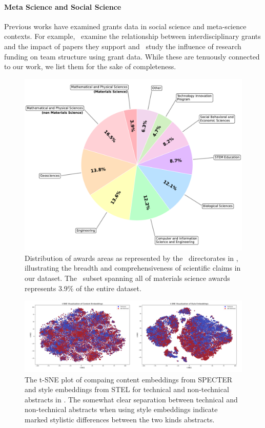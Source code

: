 \documentclass[11pt]{article}
\begin{document}
\paragraph{Meta Science and Social Science} Previous works have examined grants data in social science and meta-science contexts. For example,~\citet{park2024} examine the relationship between interdisciplinary grants and the impact of papers they support and~\citet{xu2022} study the influence of research funding on team structure using grant data. While these are tenuously connected to our work, we list them for the sake of completeness.
\begin{figure}[t]
    \centering
    \includegraphics[width=1\linewidth]{images/directorate_distribution_with_materials.pdf}
    \caption{Distribution of awards areas as represented by the \NSF~directorates in \DatasetName, illustrating the breadth and comprehensiveness of scientific claims in our dataset. The \DatasetNameMatSci~subset spanning all of materials science awards represents 3.9\% of the entire dataset.}
    \label{fig:award-distribution}
\end{figure}
\begin{figure}[h!]
    \centering
    \includegraphics[width=1\linewidth]{images/tsne-specter-stel.png}
    \caption{The t-SNE plot of compaing content embeddings from SPECTER \cite{cohan-etal-2020-specter} and style embeddings from STEL \cite{patel2025} for technical and non-technical abstracts in \DatasetNameMatSci. The somewhat clear separation between technical and non-technical abstracts when using style embeddings indicate marked stylistic differences between the two kinds abstracts.}
    \label{fig:tsne-specter-stel}
\end{figure}
\end{document}
